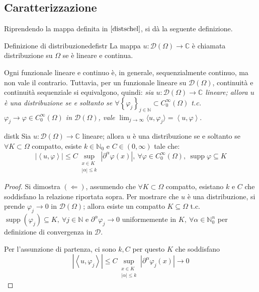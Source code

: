 \documentclass[10pt, a4paper]{scrartcl}
\theoremstyle{definition}
\numberwithin{esempio}{section}
\theoremstyle{definition}
\numberwithin{obs}{section}
\numberwithin{nota}{section}
\numberwithin{equation}{subsection}
\begin{document}
\subsection{Caratterizzazione}
Riprendendo la mappa definita in $\ref{distschel}$, si d\`a la seguente definizione.
\begin{definizione}
	{Definizione di distribuzione}{defistr}
	La mappa $u:\mathcal{D}(\Omega ) \to \mathbb{C}$ \`e chiamata distribuzione su $\Omega $ se \`e lineare e continua.
\end{definizione}
Ogni funzionale lineare e continuo \`e, in generale, sequenzialmente continuo, ma non vale il contrario. Tuttavia, per un funzionale lineare su $\mathcal{D}(\Omega )$, continuit\`a e continuit\`a sequenziale si equivalgono, quindi: \textit{sia $u:\mathcal{D}(\Omega ) \to \mathbb{C}$ lineare; allora $u$ \`e una distribuzione se e soltanto se $\forall \left\{ \varphi _j \right\} _{j\in \mathbb{N}} \subset C_0^{\infty} (\Omega )$ t.c. $\varphi _j\to \varphi \in C_0^{\infty} (\Omega )$ in $\mathcal{D}(\Omega )$, vale $\lim_{j \to \infty} \langle u,\varphi _j \rangle=\left\langle u,\varphi  \right\rangle$}.
\begin{prop}
	{}{distk}
	Sia $u:\mathcal{D}(\Omega ) \to \mathbb{C}$ lineare; allora $u$ \`e una distribuzione se e soltanto se $\forall K \subset \Omega $ compatto, esiste $k \in \mathbb{N}_0$ e $C \in (0,\infty)$ tale che:
	\begin{equation}
		\left\lvert \left\langle u,\varphi  \right\rangle \right\rvert \le C \sup_{\substack{x \in  K \\ \left\lvert \alpha   \right\rvert \le  k}} \left\lvert \partial ^\alpha  \varphi (x) \right\rvert , \ \forall \varphi  \in  C_0^\infty(\Omega ), \ \operatorname{supp} \varphi \subseteq K
	\end{equation}
	\begin{proof}
		Si dimostra $(\Leftarrow)$, assumendo che $\forall K \subset \Omega $ compatto, esistano $k$ e $C$ che soddisfano la relazione riportata sopra. Per mostrare che $u$ \`e una distribuzione, si prende $\varphi _j \to 0$ in $\mathcal{D}(\Omega )$; allora esiste un compatto $K \subseteq \Omega $ t.c. $\operatorname{supp} (\varphi _j) \subseteq K, \ \forall j \in \mathbb{N}$ e $\partial ^\alpha \varphi _j \to 0 $ uniformemente in $K, \ \forall \alpha  \in \mathbb{N}_0^n$ per definizione di convergenza in $\mathcal{D}$.

		Per l'assunzione di partenza, ci sono $k,C$ per questo $K$ che soddisfano 
		\begin{equation}
			\left\lvert \left\langle u,\varphi _j \right\rangle \right\rvert \le C \sup_{\substack{x \in K \\ \left\lvert \alpha  \right\rvert \le k}} \left\lvert \partial ^\alpha  \varphi _j(x) \right\rvert \to 0
		\end{equation}
	\end{proof}
\end{prop}
\end{document}
